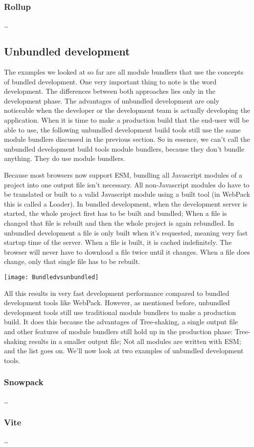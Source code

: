 \subsubsection{Rollup}

\ldots

\subsection{Unbundled development}

The examples we looked at so far are all module bundlers that use the concepts of bundled development. One very important thing to note is the word development. The differences between both approaches lies only in the development phase. The advantages of unbundled development are only noticeable when the developer or the development team is actually developing the application. When it is time to make a production build that the end-user will be able to use, the following unbundled development build tools still use the same module bundlers discussed in the previous section. So in essence, we can’t call the unbundled development build tools module bundlers, because they don’t bundle anything. They do use module bundlers.

Because most browsers now support ESM, bundling all Javascript modules of a project into one output file isn’t necessary. All non-Javascript modules do have to be translated or built to a valid Javascript module using a built tool (in WebPack this is called a Loader). In bundled development, when the development server is started, the whole project first has to be built and bundled; When a file is changed that file is rebuilt and then the whole project is again rebundled. In unbundled development a file is only built when it’s requested, meaning very fast startup time of the server. When a file is built, it is cached indefinitely. The browser will never have to download a file twice until it changes. When a file does change, only that single file has to be rebuilt. 

\texttt{[image: Bundledvsunbundled]}

All this results in very fast development performance compared to bundled development tools like WebPack. However, as mentioned before, unbundled development tools still use traditional module bundlers to make a production build. It does this because the advantages of Tree-shaking, a single output file and other features of module bundlers still hold up in the production phase: Tree-shaking results in a smaller output file; Not all modules are written with ESM; and the list goes on. We’ll now look at two examples of unbundled development tools.

\subsubsection{Snowpack}
\ldots
\subsubsection{Vite}
\ldots
